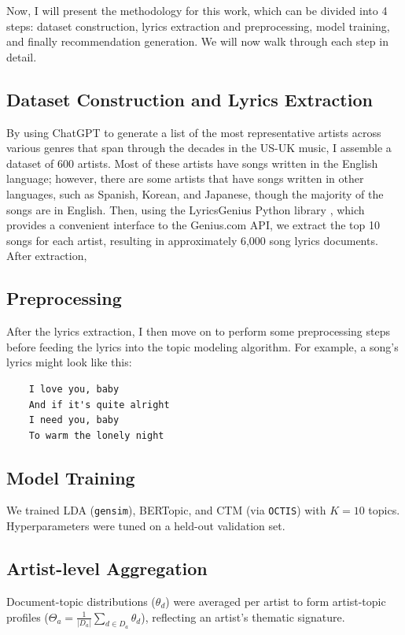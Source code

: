 \documentclass[12pt]{article}
\begin{document}
Now, I will present the methodology for this work, which can be divided into 4
steps: dataset construction, lyrics extraction and preprocessing, model
training, and finally recommendation generation. We will now walk through each
step in detail.

\subsection{Dataset Construction and Lyrics Extraction}
By using ChatGPT to generate a list of the most representative artists across
various genres that span through the decades in the US-UK music, I assemble a
dataset of 600 artists. Most of these artists have songs written in the English
language; however, there are some artists that have songs written in other
languages, such as Spanish, Korean, and Japanese, though the majority of the
songs are in English. Then, using the LyricsGenius Python library
\cite{miller2019lyricsgenius}, which provides a convenient interface to the
Genius.com API, we extract the top 10 songs for each artist, resulting in
approximately 6,000 song lyrics documents. After extraction,

\subsection{Preprocessing}
After the lyrics extraction, I then move on to perform some preprocessing steps
before feeding the lyrics into the topic modeling algorithm. For example, a song's lyrics might look like this:
\begin{verbatim}
    I love you, baby
    And if it's quite alright
    I need you, baby
    To warm the lonely night
\end{verbatim}




\subsection{Model Training}
We trained LDA (\texttt{gensim}), BERTopic, and CTM (via \texttt{OCTIS}) with
$K=10$ topics. Hyperparameters were tuned on a held-out validation set.

\subsection{Artist-level Aggregation}
Document-topic distributions ($\theta_d$) were averaged per artist to form
artist-topic profiles ($\Theta_a = \frac{1}{|D_a|} \sum_{d\in D_a} \theta_d$),
reflecting an artist's thematic signature.
\end{document}
